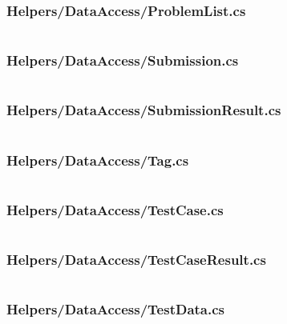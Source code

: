 \documentclass[a4paper]{report}
\begin{document}
\subsubsection{Helpers/DataAccess/ProblemList.cs}

\inputminted{csharp}{"../src/Algorithm Dynamics.Core/Helpers/DataAccess/ProblemList.cs"}

\subsubsection{Helpers/DataAccess/Submission.cs}

\inputminted{csharp}{"../src/Algorithm Dynamics.Core/Helpers/DataAccess/Submission.cs"}

\subsubsection{Helpers/DataAccess/SubmissionResult.cs}

\inputminted{csharp}{"../src/Algorithm Dynamics.Core/Helpers/DataAccess/SubmissionResult.cs"}

\subsubsection{Helpers/DataAccess/Tag.cs}

\inputminted{csharp}{"../src/Algorithm Dynamics.Core/Helpers/DataAccess/Tag.cs"}

\subsubsection{Helpers/DataAccess/TestCase.cs}

\inputminted{csharp}{"../src/Algorithm Dynamics.Core/Helpers/DataAccess/TestCase.cs"}

\subsubsection{Helpers/DataAccess/TestCaseResult.cs}

\inputminted{csharp}{"../src/Algorithm Dynamics.Core/Helpers/DataAccess/TestCaseResult.cs"}

\subsubsection{Helpers/DataAccess/TestData.cs}

\inputminted{csharp}{"../src/Algorithm Dynamics.Core/Helpers/DataAccess/TestData.cs"}
\end{document}
